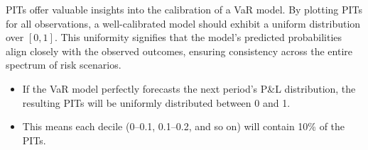 
PITs offer valuable insights into the calibration of a VaR model. By plotting PITs for all
observations, a well-calibrated model should exhibit a uniform distribution over $[0,1]$. This
uniformity signifies that the model's predicted probabilities align closely with the observed
outcomes, ensuring consistency across the entire spectrum of risk scenarios.

\begin{itemize}
\item If the VaR model perfectly forecasts the next period's P\&L distribution, the resulting
      PITs will be uniformly distributed between 0 and 1.
\item This means each decile (0--0.1, 0.1--0.2, and so on) will contain 10\% of the PITs.
\end{itemize}

